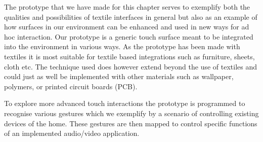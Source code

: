 The prototype that we have made for this chapter serves to exemplify both the qualities and possibilities of textile interfaces in general but also as an example of how surfaces in our environment can be enhanced and used in new ways for ad hoc interaction.
Our prototype is a generic touch surface meant to be integrated into the environment in various ways.
As the prototype has been made with textiles it is most suitable for textile based integrations such as furniture, sheets, cloth etc.
The technique used does however extend beyond the use of textiles and could just as well be implemented with other materials such as wallpaper, polymers, or printed circuit boards (PCB).

To explore more advanced touch interactions the prototype is programmed to recognise various gestures which we exemplify by a scenario of controlling existing devices of the home.
These gestures are then mapped to control specific functions of an implemented audio/video application. 

